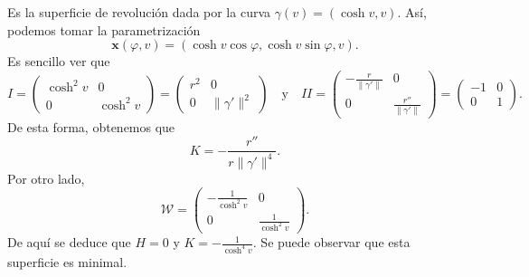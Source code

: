 \begin{eg}
Es la superficie de revolución dada por la curva $\displaystyle \gamma\left(v\right)=\left(\cosh v, v\right) $. Así, podemos tomar la parametrización
\[ \textbf{x} \left(\varphi, v\right)=\left(\cosh v \cos \varphi, \cosh v\sin\varphi, v\right) .\]
Es sencillo ver que
\[I = \begin{pmatrix} \cosh^{2}v & 0 \\ 0 & \cosh^{2}v \end{pmatrix}=\begin{pmatrix} r^{2} & 0 \\ 0 & \|\gamma'\|^{2} \end{pmatrix} \quad \text{y} \quad II = \begin{pmatrix} -\frac{r}{\|\gamma'\|} & 0 \\ 0 & \frac{r''}{\|\gamma'\|} \end{pmatrix}=\begin{pmatrix} -1 & 0 \\ 0 & 1 \end{pmatrix}.\]
De esta forma, obtenemos que 
\[K = -\frac{r''}{r\|\gamma'\|^{4}} .\]
Por otro lado, 
\[\mathcal{W}=\begin{pmatrix} -\frac{1}{\cosh^{2}v} & 0 \\ 0 & \frac{1}{\cosh^{2}v} \end{pmatrix} .\]
De aquí se deduce que $\displaystyle H = 0 $ y $\displaystyle K = -\frac{1}{\cosh^{4}v} $. Se puede observar que esta superficie es minimal. 
\end{eg}
